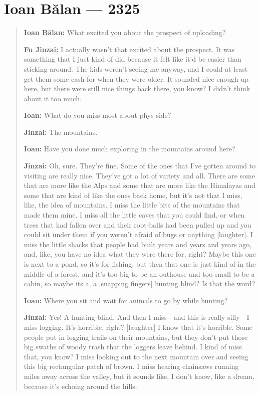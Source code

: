 \hypertarget{ioan-bux103lan-2325}{%
\chapter{Ioan Bălan — 2325}\label{ioan-bux103lan-2325}}

\begin{quote}
\textbf{Ioan Bălan:} What excited you about the prospect of uploading?

\textbf{Fu Jinzai:} I actually wasn't that excited about the prospect. It was something that I just kind of did because it felt like it'd be easier than sticking around. The kids weren't seeing me anyway, and I could at least get them some cash for when they were older. It sounded nice enough up here, but there were still nice things back there, you know? I didn't think about it too much.

\textbf{Ioan:} What do you miss most about phys-side?

\textbf{Jinzai:} The mountains.

\textbf{Ioan:} Have you done much exploring in the mountains around here?

\textbf{Jinzai:} Oh, sure. They're fine. Some of the ones that I've gotten around to visiting are really nice. They've got a lot of variety and all. There are some that are more like the Alps and some that are more like the Himalayas and some that are kind of like the ones back home, but it's not that I miss, like, the idea of mountains. I miss the little bits of the mountains that made them mine. I miss all the little caves that you could find, or when trees that had fallen over and their root-balls had been pulled up and you could sit under them if you weren't afraid of bugs or anything {[}laughter{]}. I miss the little shacks that people had built years and years and years ago, and, like, you have no idea what they were there for, right? Maybe this one is next to a pond, so it's for fishing, but then that one is just kind of in the middle of a forest, and it's too big to be an outhouse and too small to be a cabin, so maybe its a, a {[}snapping fingers{]} hunting blind? Is that the word?

\textbf{Ioan:} Where you sit and wait for animals to go by while hunting?

\textbf{Jinzai:} Yes! A hunting blind. And then I miss---and this is really silly---I miss logging. It's horrible, right? {[}laughter{]} I know that it's horrible. Some people put in logging trails on their mountains, but they don't put those big swaths of woody trash that the loggers leave behind. I kind of miss that, you know? I miss looking out to the next mountain over and seeing this big rectangular patch of brown. I miss hearing chainsaws running miles away across the valley, but it sounds like, I don't know, like a dream, because it's echoing around the hills.


\end{quote}
